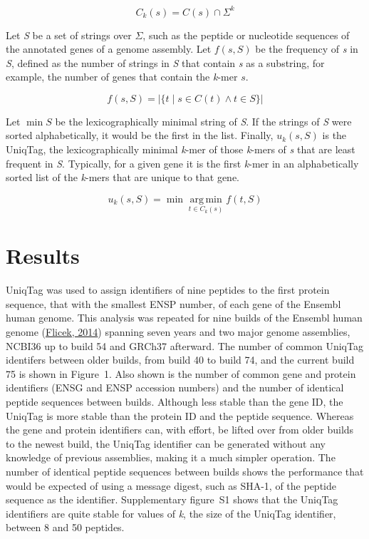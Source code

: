 \documentclass{bioinfo}
\begin{document}
\[
C_k(s) = C(s) \cap \Sigma^k
\]

Let \emph{S} be a set of strings over $\Sigma$, such as the peptide or
nucleotide sequences of the annotated genes of a genome assembly. Let
$f(s, S)$ be the frequency of \emph{s} in \emph{S}, defined as the
number of strings in \emph{S} that contain \emph{s} as a substring, for
example, the number of genes that contain the \emph{k}-mer $s$.

\[
f(s, S) = \left\vert \{ t \mid s \in C(t) \wedge t \in S \} \right\vert
\]

Let $\min S$ be the lexicographically minimal string of \emph{S}. If the
strings of \emph{S} were sorted alphabetically, it would be the first in
the list. Finally, $u_k(s, S)$ is the UniqTag, the lexicographically
minimal \emph{k}-mer of those \emph{k}-mers of \emph{s} that are least
frequent in \emph{S}. Typically, for a given gene it is the first
\emph{k}-mer in an alphabetically sorted list of the \emph{k}-mers that
are unique to that gene.

\[
u_k(s, S) = \min \mathop{\arg\,\min}\limits_{t \in C_k(s)} f(t, S)
\]

\section{Results}\label{results}

UniqTag was used to assign identifiers of nine peptides to the first
protein sequence, that with the smallest ENSP number, of each gene of
the Ensembl human genome. This analysis was repeated for nine builds of
the Ensembl human genome
(\href{http://dx.doi.org/10.1093/nar/gkt1196}{Flicek, 2014}) spanning
seven years and two major genome assemblies, NCBI36 up to build 54 and
GRCh37 afterward. The number of common UniqTag identifers between older
builds, from build 40 to build 74, and the current build 75 is shown in
Figure~1. Also shown is the number of common gene and protein
identifiers (ENSG and ENSP accession numbers) and the number of
identical peptide sequences between builds. Although less stable than
the gene ID, the UniqTag is more stable than the protein ID and the
peptide sequence. Whereas the gene and protein identifiers can, with
effort, be lifted over from older builds to the newest build, the
UniqTag identifier can be generated without any knowledge of previous
assemblies, making it a much simpler operation. The number of identical
peptide sequences between builds shows the performance that would be
expected of using a message digest, such as SHA-1, of the peptide
sequence as the identifier. Supplementary figure~S1 shows that the
UniqTag identifiers are quite stable for values of \emph{k}, the size of
the UniqTag identifier, between 8 and 50 peptides.
\end{document}
